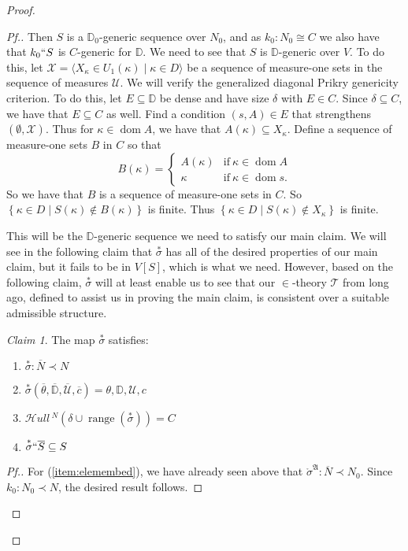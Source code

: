 \documentclass{amsart}
\theoremstyle{definition}
\theoremstyle{remark}
\newtheorem{claimno}{Claim}
\newcommand{\D}{\mathbb{D}}
\newcommand{\N}{{\overline{N}}}
\renewcommand{\S}{{\overline{S}}}
\newcommand{\U}{\mathcal{U}}
\DeclareMathOperator{\ran}{range}
\DeclareMathOperator{\dom}{dom}
\newcommand{\st}{\; | \;}
\newcommand{\set}[2]{\left\{#1\st #2 \right\}}
\newcommand{\seq}[2]{\langle #1 \st #2 \rangle}
\newcommand{\SH}{\mathcal{H}\textit{ull} \,}
\newcommand{\sk}[3]{\SH^{#1}( {#2} \cup {\ran(#3)} ) }
\begin{document}
\begin{proof}
\begin{proof}[Pf.]
Then $S$ is a $\D_0$-generic sequence over $N_0$, and as $k_0:N_0 \cong C$ we also have that $k_0``S$ is $C$-generic for $\D$. We need to see that $S$ is $\D$-generic over $V$. To do this, let $\mathcal X = \seq{ X_\kappa \in U_1(\kappa) }{ \kappa \in D }$ be a sequence of measure-one sets in the sequence of measures $\U$. We will verify the generalized diagonal Prikry genericity criterion. To do this, let $E \subseteq \D$ be dense and have size $\delta$ with $E \in C$. Since $\delta \subseteq C$, we have that $E \subseteq C$ as well. Find a condition $(s,A) \in E$ that strengthens $(\emptyset, \mathcal X)$. Thus for $\kappa \in \dom A$, we have that $A(\kappa) \subseteq X_\kappa$. Define a sequence of measure-one sets $B$ in $C$ so that 
$$B(\kappa) = \begin{cases} A(\kappa) &\text{if} \ \kappa \in \dom A \\ \kappa &\text{if} \ \kappa \in \dom s. \end{cases}$$
So we have that $B$ is a sequence of measure-one sets in $C$. So $\set{ \kappa \in D }{S(\kappa) \notin B(\kappa) }$ is finite. Thus $\set{\kappa \in D}{ S(\kappa) \notin X_\kappa}$ is finite.


This will be the $\D$-generic sequence we need to satisfy our main claim. We will see in the following claim that $\overset{*} \sigma$ has all of the desired properties of our main claim, but it fails to be in $V[S]$, which is what we need. However, based on the following claim, $\overset{*}{\sigma}$ will at least enable us to see that our $\in$-theory $\mathcal T$ from long ago, defined to assist us in proving the main claim, is consistent over a suitable admissible structure.
\begin{claimno} The map $\overset{*}{\sigma}$ satisfies:
\begin{enumerate}
	\item \label{item:elemembed} $\overset{*} {\sigma}: \N \prec N$
	\item \label{item:rangematches} $\overset{*} {\sigma}(\overline \theta, \overline{\D}, \overline{\U}, \overline c)=\theta, \D, \U, c$
	\item \label{item:skolemC} $\sk{N}{\delta}{\overset{*}{\sigma}} = C$	
	\item \label{item:lifts} $\overset{*} {\sigma} `` \S \subseteq S$
\end{enumerate}
\end{claimno}
\begin{proof}[Pf.]
For (\ref{item:elemembed}), we have already seen above that $\mathring \sigma^{\mathfrak A}: \N \prec N_0$. Since $k_0:N_0 \prec N$, the desired result follows.


\end{proof}
\end{proof}
\end{proof}
\end{document}
